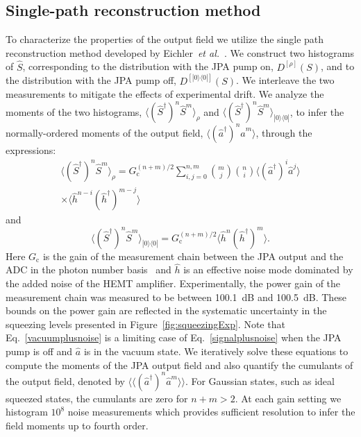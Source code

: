 \documentclass[pra,twocolumn,superscriptaddress]{revtex4-1}
\begin{document}
\subsection{Single-path reconstruction method}\label{app:expSPM}
To characterize the properties of the output field we utilize the single path reconstruction method developed by Eichler~\textit{et al.}~\cite{Eichler_PRL_2011}. We construct two histograms of $\hat{S}$, corresponding to the distribution with the JPA pump on, $D^{[\rho]}\left(S\right)$, and to the distribution with the JPA pump off, $D^{[\left|0\rangle\langle0\right|]}\left(S\right)$. We interleave the two measurements to mitigate the effects of experimental drift. We analyze the moments of the two histograms, $\langle ( \hat{S}^\dagger)^n \hat{S}^m \rangle_{\rho}$ and $\langle ( \hat{S}^\dagger)^n \hat{S}^m \rangle_{\left|0\rangle\langle0\right|}$, to infer the normally-ordered moments of the output field, $\langle (\hat a^\dagger )^n \hat a^m \rangle$, through the expressions:  
\begin{multline}\label{signalplusnoise}
\langle ( \hat{S}^\dagger)^n \hat{S}^m \rangle_{\rho} = G_\mathrm{c}^{(n+m)/2} \sum \limits_{i,j=0}^{n,m} {m \choose j} {n \choose i}\langle (\hat a^\dagger )^i \hat a^j \rangle \\ \times \langle \hat h^{n-i} (\hat h^\dagger)^{m-j} \rangle
\end{multline}  
and 
\begin{equation}\label{vacuumplusnoise}
\langle ( \hat{S}^\dagger)^n \hat{S}^m \rangle_{\left|0\rangle\langle0\right|} = G_\mathrm{c}^{(n+m)/2} \langle \hat h^{n} ( \hat h^\dagger)^{m} \rangle.
\end{equation}
Here $G_\mathrm{c}$ is the gain of the measurement chain between the JPA output and the ADC in the photon number basis~\cite{Menzel_PRL_2012, Menzel_thesis} and $\hat h$ is an effective noise mode dominated by the added noise of the HEMT amplifier.  
Experimentally, the power gain of the measurement chain was measured to be between 100.1~dB and 100.5~dB. These bounds on the power gain are reflected in the systematic uncertainty in the squeezing levels presented in Figure~\ref{fig:squeezingExp}.
Note that Eq.~\ref{vacuumplusnoise} is a limiting case of Eq.~\ref{signalplusnoise} when the JPA pump is off and $\hat a$ is in the vacuum state.  We iteratively solve these equations to compute the moments of the JPA output field and also quantify the cumulants of the output field, denoted by $\langle\! \langle (\hat a^\dagger )^n \hat a^m \rangle\!\rangle$. For Gaussian states, such as ideal squeezed states, the cumulants are zero for $n + m > 2$.  At each gain setting we histogram $10^8$ noise measurements which provides sufficient resolution to infer the field moments up to fourth order.
\end{document}
